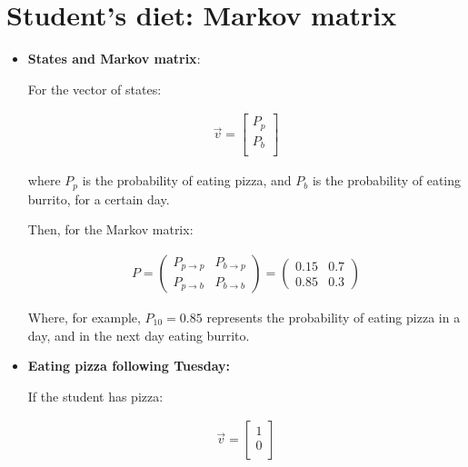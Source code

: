 \documentclass[paper=a4, fontsize=11pt]{scrartcl} %
\numberwithin{equation}{section} %
\numberwithin{figure}{section} %
\numberwithin{table}{section} %
\begin{document}
\begin{itemize}
\end{itemize}


\section{Student's diet: Markov matrix}

\begin{itemize}

\item \textbf{States and Markov matrix}:

For the vector of states:

\begin{equation}
\begin{split}
\vec{v}=\begin{bmatrix}
    P_{p} \\
    P_{b} \\
  \end{bmatrix}
\end{split}
\label{eq:markov_matrix1}
\end{equation}

where $P_{p}$ is the probability of eating pizza, and $P_{b}$ is the probability of eating burrito, for a certain day.

Then, for the Markov matrix:


\begin{equation}
\begin{split}
P = \left(\begin{array}{cc} P_{p\rightarrow p} & P_{b\rightarrow p}\\ P_{p\rightarrow b} & P_{b\rightarrow b} \end{array}\right) = \left(\begin{array}{cc} 0.15 & 0.7\\ 0.85 & 0.3 \end{array}\right)
\end{split}
\label{eq:markov_matrix2}
\end{equation}

Where, for example, $P_{10} = 0.85$ represents the probability of eating pizza in a day, and in the next day eating burrito.


\item \textbf{Eating pizza following Tuesday:}

If the student has pizza:

\begin{equation}
\begin{split}
\vec{v}=\begin{bmatrix}1 \\ 0 \\ \end{bmatrix}
\end{split}
\label{eq:markov_matrix3}
\end{equation}


\end{itemize}
\end{document}
